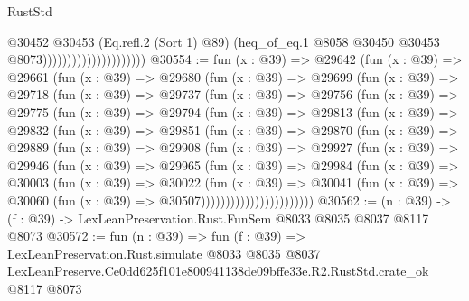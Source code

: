 \begin{lexlean}{RustStd}
\begin{coremodule}
                                          @30452
                                            @30453
                                            (Eq.refl.{2} (Sort 1) @89)
                                            (heq_of_eq.{1}
                                              @8058
                                              @30450
                                              @30453
                                              @8073)))))))))))))))))))))
@30554 := fun (x : @39) =>
  @29642
    (fun (x : @39) =>
    @29661
      (fun (x : @39) =>
      @29680
        (fun (x : @39) =>
        @29699
          (fun (x : @39) =>
          @29718
            (fun (x : @39) =>
            @29737
              (fun (x : @39) =>
              @29756
                (fun (x : @39) =>
                @29775
                  (fun (x : @39) =>
                  @29794
                    (fun (x : @39) =>
                    @29813
                      (fun (x : @39) =>
                      @29832
                        (fun (x : @39) =>
                        @29851
                          (fun (x : @39) =>
                          @29870
                            (fun (x : @39) =>
                            @29889
                              (fun (x : @39) =>
                              @29908
                                (fun (x : @39) =>
                                @29927
                                  (fun (x : @39) =>
                                  @29946
                                    (fun (x : @39) =>
                                    @29965
                                      (fun (x : @39) =>
                                      @29984
                                        (fun (x : @39) =>
                                        @30003
                                          (fun (x : @39) =>
                                          @30022
                                            (fun (x : @39) =>
                                            @30041
                                              (fun (x : @39) =>
                                              @30060 (fun (x : @39) => @30507)))))))))))))))))))))))
@30562 := (n : @39) -> (f : @39) -> LexLeanPreservation.Rust.FunSem @8033 @8035 @8037 @8117 @8073
@30572 := fun (n : @39) =>
  fun (f : @39) =>
  LexLeanPreservation.Rust.simulate
    @8033
    @8035
    @8037
    LexLeanPreserve.Ce0dd625f101e800941138de09bffe33e.R2.RustStd.crate_ok
    @8117
    @8073
\end{coremodule}
\end{lexlean}
